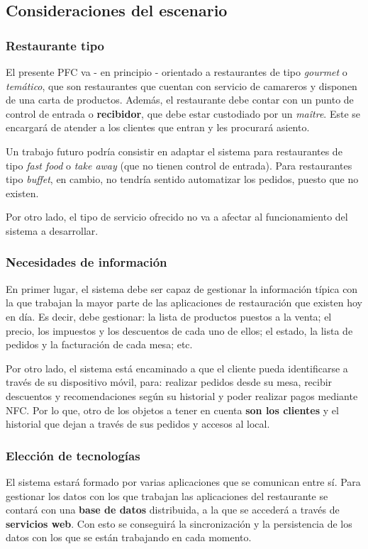   \subsection{Consideraciones del escenario}
    \subsubsection{Restaurante tipo}
  El presente \acs{PFC} va - en principio - orientado a restaurantes de tipo
  \emph{gourmet} o \emph{temático}, que son restaurantes que cuentan con
  servicio de camareros y disponen de una carta de productos. Además, el
  restaurante debe contar con un punto de  control de entrada o
  \textbf{recibidor}, que debe estar custodiado por un \emph{maître}. Este se
  encargará de atender a los clientes que entran y les procurará asiento.

  Un trabajo futuro podría consistir en adaptar el sistema para restaurantes 
  de tipo \emph{fast food} o \emph{take away} (que no tienen control de 
  entrada). Para restaurantes tipo \emph{buffet}, en cambio, no tendría
  sentido automatizar los pedidos, puesto que no existen.

  Por otro lado, el tipo de servicio ofrecido no va a afectar al funcionamiento
  del sistema a desarrollar.

    \subsubsection{Necesidades de información}
  En primer lugar, el sistema debe ser capaz de gestionar la información
  típica con la que trabajan la mayor parte de las aplicaciones de
  restauración que existen hoy en día. Es decir, debe gestionar: la lista
  de productos puestos a la venta; el precio, los impuestos y los
  descuentos de cada uno de ellos; el estado, la lista de pedidos y la
  facturación de cada mesa; etc.

  Por otro lado, el sistema está encaminado a que el cliente pueda 
  identificarse a través de su dispositivo móvil, para: realizar
  pedidos desde su mesa, recibir descuentos y recomendaciones según su
  historial y poder realizar pagos mediante \acs{NFC}. Por lo que, otro de los
  objetos a tener en cuenta \textbf{son los clientes} y el historial que dejan
  a través de sus pedidos y accesos al local.

    \subsubsection{Elección de tecnologías}
  El sistema estará formado por varias aplicaciones que se comunican entre sí.
  Para gestionar los datos con los que trabajan las aplicaciones del
  restaurante se contará con una \textbf{base de datos} distribuida, a la que
  se accederá a través de \textbf{servicios web}. Con esto se conseguirá la
  sincronización y la persistencia de los datos con los que se están trabajando
  en cada momento.

